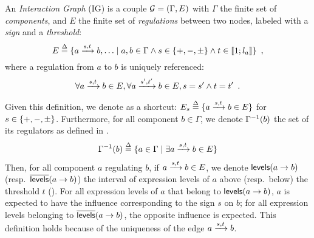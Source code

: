
\begin{definition}
\label{def:ig}
An \emph{Interaction Graph} (IG) is a couple $\mathcal{G} = (\Gamma, E)$ with $\Gamma$ the finite set of \emph{components},
and $E$ the finite set of \emph{regulations} between two nodes, labeled with a \emph{sign} and a \emph{threshold}:
$$E \stackrel{\Delta}= \{ a \xrightarrow{s, t} b, \ldots \mid a, b \in \Gamma \wedge s \in \{ +, -, \pm \} \wedge t \in \llbracket 1 ; l_a \rrbracket\} \enspace,$$
where a regulation from $a$ to $b$ is uniquely referenced:
$$\forall a \xrightarrow{s, t} b \in E, \forall a \xrightarrow{s', t'} b \in E, s = s' \wedge t = t' \enspace.$$
\end{definition}


Given this definition, we denote as a shortcut:
$E_s \stackrel{\Delta}= \{ a \xrightarrow{s, t} b \in E \}$ for $s \in \{ +, -, \pm \}$.
Furthermore, for all component $b \in \Gamma$, we denote $\Gamma^{-1}(b)$ the set of its regulators as defined in .
\begin{align}
\label{eq:grn-regulators}
  \Gamma^{-1}(b) \stackrel{\Delta}= \{ a\in\Gamma\mid \exists a \xrightarrow{s, t} b \in E \}
\end{align}
Then, for all component $a$ regulating $b$,
\ie if $a \xrightarrow{s, t} b \in E$,
we denote $\mathsf{levels}(a\rightarrow b)$ (resp.~$\overline{\mathsf{levels}}(a\rightarrow b)$) the interval of expression levels of $a$ above (resp.~below) the threshold $t$ ().
For all expression levels of $a$ that belong to $\mathsf{levels}(a\rightarrow b)$, $a$ is expected to have the influence corresponding to the sign $s$ on $b$;
for all expression levels belonging to $\overline{\mathsf{levels}}(a\rightarrow b)$, the opposite influence is expected.
This definition holds because of the uniqueness of the edge $a \xrightarrow{s, t} b$.

